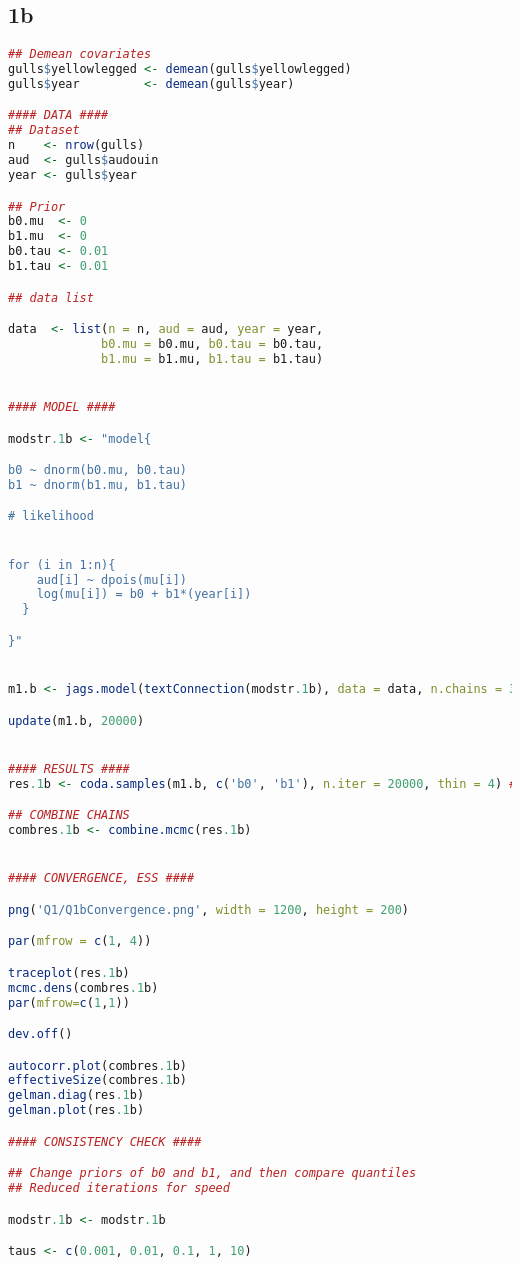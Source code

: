 \documentclass[11pt]{article}
\begin{document}
\subsection{1b} \label{appA1b}
\begin{lstlisting}[language=R]
## Demean covariates
gulls$yellowlegged <- demean(gulls$yellowlegged)
gulls$year         <- demean(gulls$year)

#### DATA ####
## Dataset
n    <- nrow(gulls)
aud  <- gulls$audouin
year <- gulls$year

## Prior
b0.mu  <- 0
b1.mu  <- 0
b0.tau <- 0.01
b1.tau <- 0.01

## data list

data  <- list(n = n, aud = aud, year = year,
             b0.mu = b0.mu, b0.tau = b0.tau, 
             b1.mu = b1.mu, b1.tau = b1.tau)


#### MODEL ####

modstr.1b <- "model{

b0 ~ dnorm(b0.mu, b0.tau)
b1 ~ dnorm(b1.mu, b1.tau)

# likelihood


for (i in 1:n){
    aud[i] ~ dpois(mu[i])
    log(mu[i]) = b0 + b1*(year[i])
  }

}"


m1.b <- jags.model(textConnection(modstr.1b), data = data, n.chains = 3)

update(m1.b, 20000)


#### RESULTS ####
res.1b <- coda.samples(m1.b, c('b0', 'b1'), n.iter = 20000, thin = 4) ## thin to make following steps quicker

## COMBINE CHAINS 
combres.1b <- combine.mcmc(res.1b)


#### CONVERGENCE, ESS ####

png('Q1/Q1bConvergence.png', width = 1200, height = 200)

par(mfrow = c(1, 4))

traceplot(res.1b)
mcmc.dens(combres.1b)
par(mfrow=c(1,1))

dev.off()

autocorr.plot(combres.1b)
effectiveSize(combres.1b)
gelman.diag(res.1b)
gelman.plot(res.1b)

#### CONSISTENCY CHECK ####

## Change priors of b0 and b1, and then compare quantiles
## Reduced iterations for speed

modstr.1b <- modstr.1b

taus <- c(0.001, 0.01, 0.1, 1, 10)


\end{lstlisting}
\end{document}
